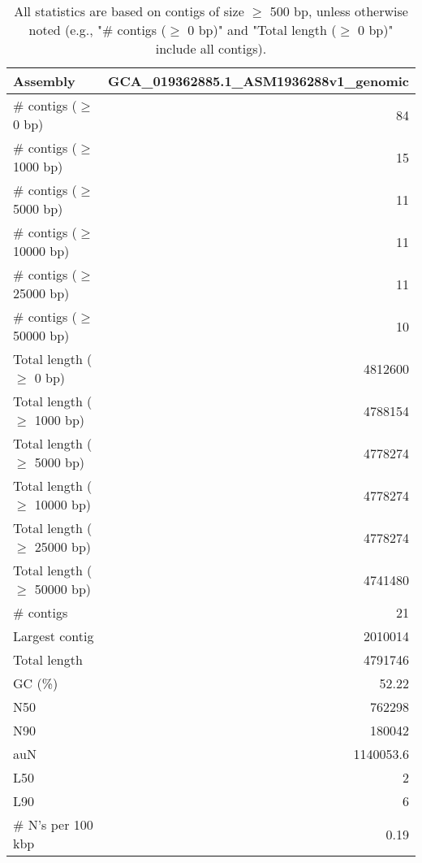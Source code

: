 \documentclass[12pt,a4paper]{article}
\begin{document}
\begin{table}[ht]
\begin{center}
\caption{All statistics are based on contigs of size $\geq$ 500 bp, unless otherwise noted (e.g., "\# contigs ($\geq$ 0 bp)" and "Total length ($\geq$ 0 bp)" include all contigs).}
\begin{tabular}{|l*{1}{|r}|}
\hline
Assembly & GCA\_019362885.1\_ASM1936288v1\_genomic \\ \hline
\# contigs ($\geq$ 0 bp) & 84 \\ \hline
\# contigs ($\geq$ 1000 bp) & 15 \\ \hline
\# contigs ($\geq$ 5000 bp) & 11 \\ \hline
\# contigs ($\geq$ 10000 bp) & 11 \\ \hline
\# contigs ($\geq$ 25000 bp) & 11 \\ \hline
\# contigs ($\geq$ 50000 bp) & 10 \\ \hline
Total length ($\geq$ 0 bp) & 4812600 \\ \hline
Total length ($\geq$ 1000 bp) & 4788154 \\ \hline
Total length ($\geq$ 5000 bp) & 4778274 \\ \hline
Total length ($\geq$ 10000 bp) & 4778274 \\ \hline
Total length ($\geq$ 25000 bp) & 4778274 \\ \hline
Total length ($\geq$ 50000 bp) & 4741480 \\ \hline
\# contigs & 21 \\ \hline
Largest contig & 2010014 \\ \hline
Total length & 4791746 \\ \hline
GC (\%) & 52.22 \\ \hline
N50 & 762298 \\ \hline
N90 & 180042 \\ \hline
auN & 1140053.6 \\ \hline
L50 & 2 \\ \hline
L90 & 6 \\ \hline
\# N's per 100 kbp & 0.19 \\ \hline
\end{tabular}
\end{center}
\end{table}
\end{document}
